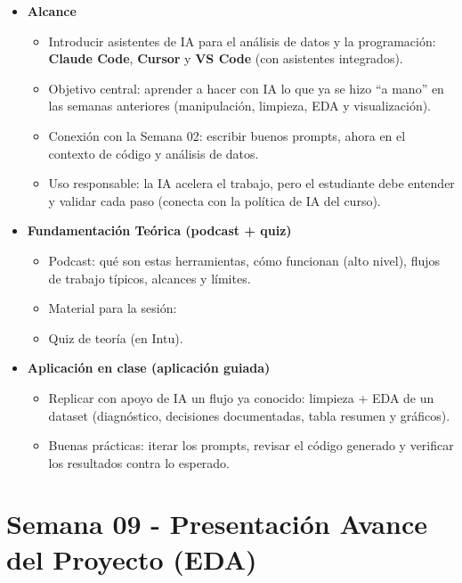 \documentclass{article}
\begin{document}
\begin{itemize}
\item \textbf{Alcance}
\begin{itemize}
  \item Introducir asistentes de IA para el análisis de datos y la programación: \textbf{Claude Code}, \textbf{Cursor} y \textbf{VS Code} (con asistentes integrados).
  \item Objetivo central: aprender a hacer con IA lo que ya se hizo ``a mano'' en las semanas anteriores (manipulación, limpieza, EDA y visualización).
  \item Conexión con la Semana 02: escribir buenos prompts, ahora en el contexto de código y análisis de datos.
  \item Uso responsable: la IA acelera el trabajo, pero el estudiante debe entender y validar cada paso (conecta con la política de IA del curso).
\end{itemize}

\item \textbf{Fundamentación Teórica (podcast + quiz)}
\begin{itemize}
  \item Podcast: qué son estas herramientas, cómo funcionan (alto nivel), flujos de trabajo típicos, alcances y límites. %
  \item Material para la sesión: %
  \item Quiz de teoría (en Intu).
\end{itemize}

\item \textbf{Aplicación en clase (aplicación guiada)}
\begin{itemize}
  \item Replicar con apoyo de IA un flujo ya conocido: limpieza + EDA de un dataset (diagnóstico, decisiones documentadas, tabla resumen y gráficos).
  \item Buenas prácticas: iterar los prompts, revisar el código generado y verificar los resultados contra lo esperado.
\end{itemize}
\end{itemize}

\newpage
\section*{Semana 09 - Presentación Avance del Proyecto (EDA)}
\vspace{0.2 cm}
\end{document}
